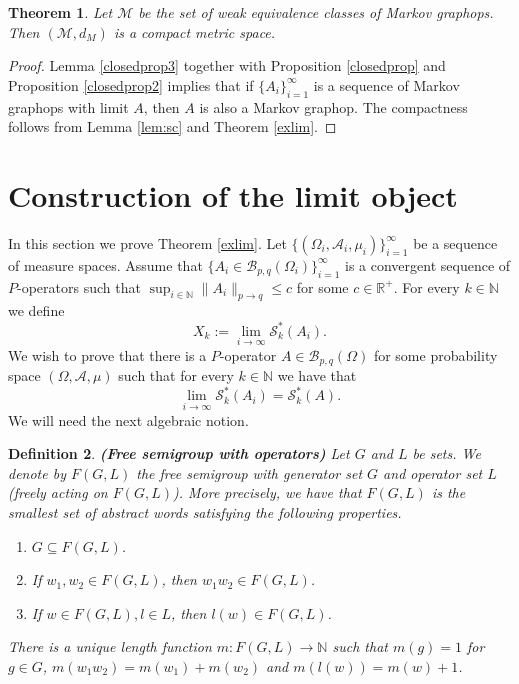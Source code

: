 \documentclass[a4wider]{amsart}
\newtheorem{theorem}{Theorem}[section]
\newtheorem{definition}[theorem]{Definition}
\theoremstyle{definitionbreak}\newtheorem{D}[theorem]{Definition}
\theoremstyle{definitionbreak}\newtheorem*{D*}{Definition}
\begin{document}
\begin{theorem}\label{markcomp} Let $\mathcal{M}$ be the set of weak equivalence classes of Markov graphops. Then $(\mathcal{M},d_M)$ is a compact metric space. 
\end{theorem}

\begin{proof} Lemma \ref{closedprop3} together with Proposition \ref{closedprop} and Proposition \ref{closedprop2} implies that if $\{A_i\}_{i=1}^\infty$ is a sequence of Markov graphops with limit $A$, then $A$ is also a Markov graphop. The compactness follows from Lemma \ref{lem:sc} and Theorem \ref{exlim}.
\end{proof}

\section{Construction of the limit object}\label{proofexlim}

In this section we prove Theorem \ref{exlim}. 
Let $\{(\Omega_i,\mathcal{A}_i,\mu_i)\}_{i=1}^\infty$ be a sequence of measure spaces. Assume that $\{A_i\in\mathcal{B}_{p,q}(\Omega_i)\}_{i=1}^\infty$ is a convergent sequence of $P$-operators such that $\sup_{i\in\mathbb{N}}\|A_i\|_{p\rightarrow q}\leq c$ for some $c\in\mathbb{R}^+$. For every $k\in\mathbb N$ we define \[X_k:=\lim_{i\rightarrow\infty} \mathcal{S}^*_k(A_i).\] 
We wish to prove that there is a $P$-operator $A\in\mathcal{B}_{p,q}(\Omega)$ for some probability space $(\Omega,\mathcal{A},\mu)$ such that for every $k\in\mathbb{N}$ we have that $$\lim_{i\to\infty}\mathcal{S}^*_k(A_i)=\mathcal{S}_k^*(A).$$ 
We will need the next algebraic notion.

\begin{definition}\label{fsg} {\bf (Free  semigroup with operators)} Let $G$ and $L$ be sets. We denote by $F(G,L)$ the free semigroup with generator set $G$ and operator set $L$ (freely acting on $F(G,L)$).  More precisely, we have that $F(G,L)$ is the smallest set of abstract words satisfying the following properties.
\begin{enumerate} 
\item $G\subseteq F(G,L)$.
\item If $w_1,w_2\in F(G,L)$, then $w_1w_2\in F(G,L)$.
\item If $w\in F(G,L), l\in L$, then $l(w)\in F(G,L)$.
\end{enumerate}
There is a unique length function $m: F(G,L)\to\mathbb{N}$ such that $m(g)=1$ for $g\in G$, $m(w_1w_2)=m(w_1)+m(w_2)$ and $m(l(w))=m(w)+1$. 
\end{definition}
\end{document}
